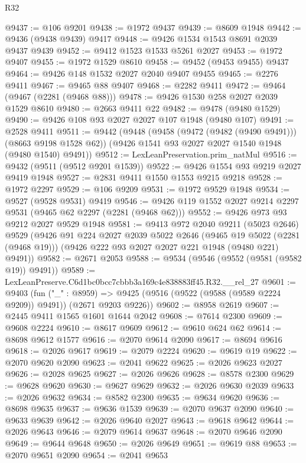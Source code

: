 \begin{lexlean}{R32}
\begin{coremodule}
@9437 := @106 @9201
@9438 := @1972 @9437
@9439 := @8609 @1948
@9442 := @9436 (@9438 @9439) @9417
@9448 := @9426 @1534 @1543 @8691 @2039 @9437 @9439
@9452 := @9412 @1523 @1533 @5261 @2027
@9453 := @1972 @9407
@9455 := @1972 @1529 @8610
@9458 := @9452 (@9453 @9455) @9437
@9464 := @9426 @148 @1532 @2027 @2040 @9407 @9455
@9465 := @2276 @9411
@9467 := @9465 @88 @9407
@9468 := @2282 @9411
@9472 := @9464 (@9467 (@2281 (@9468 @88)))
@9478 := @9426 @1530 @258 @2027 @2039 @1529 @8610
@9480 := @2663 @9411 @22
@9482 := @9478 (@9480 @1529)
@9490 := @9426 @108 @93 @2027 @2027 @107 @1948 (@9480 @107)
@9491 := @2528 @9411
@9511 := @9442
    (@9448
      (@9458 (@9472 (@9482 (@9490 @9491))) (@8663 @9198 @1528 @62))
      (@9426 @1541 @93 @2027 @2027 @1540 @1948 (@9480 @1540) @9491))
@9512 := LexLeanPreservation.prim_natMul
@9516 := @9432 (@9511 (@9512 @9201 @1539))
@9522 := @9426 @1554 @93 @9219 @2027 @9419 @1948
@9527 := @2831 @9411 @1550 @1553 @9215 @9218
@9528 := @1972 @2297
@9529 := @106 @9209
@9531 := @1972 @9529 @1948
@9534 := @9527 (@9528 @9531) @9419
@9546 := @9426 @119 @1552 @2027 @9214 @2297 @9531 (@9465 @62 @2297 (@2281 (@9468 @62)))
@9552 := @9426 @973 @93 @9212 @2027 @9529 @1948
@9581 := @9413
    @972
    @2040
    @9211
    (@5023 @2646)
    @9529
    (@9426
      @91
      @224
      @2027
      @2039
      @5022
      @2646
      (@9465 @19 @5022 (@2281 (@9468 @19)))
      (@9426 @222 @93 @2027 @2027 @221 @1948 (@9480 @221) @9491))
@9582 := @2671 @2053
@9588 := @9534 (@9546 (@9552 (@9581 (@9582 @19)) @9491))
@9589 := LexLeanPreserve.C6d1bc0bcc7cbbb3a169c4e838883ff45.R32.__rel_27
@9601 := @9403
    (fun ("_" : @8959) =>
    @9425 (@9516 (@9522 (@9588 (@9589 @2224 @9209)) @9491)) (@2671 @9203 @9226))
@9602 := @8958 @2619
@9607 := @2445 @9411 @1565 @1601 @1644 @2042
@9608 := @7614 @2300
@9609 := @9608 @2224
@9610 := @8617 @9609
@9612 := @9610 @624 @62
@9614 := @8698 @9612 @1577
@9616 := @2070 @9614 @2090
@9617 := @8694 @9616
@9618 := @2026 @9617
@9619 := @2079 @2224
@9620 := @9619 @19
@9622 := @2070 @9620 @2090
@9623 := @2041 @9622
@9625 := @2026 @9623 @2027
@9626 := @2028 @9625
@9627 := @2026 @9626
@9628 := @8578 @2300
@9629 := @9628 @9620
@9630 := @9627 @9629
@9632 := @2026 @9630 @2039
@9633 := @2026 @9632
@9634 := @8582 @2300
@9635 := @9634 @9620
@9636 := @8698 @9635
@9637 := @9636 @1539
@9639 := @2070 @9637 @2090
@9640 := @9633 @9639
@9642 := @2026 @9640 @2027
@9643 := @9618 @9642
@9644 := @2026 @9643
@9646 := @2079 @9614 @9637
@9648 := @2070 @9646 @2090
@9649 := @9644 @9648
@9650 := @2026 @9649
@9651 := @9619 @88
@9653 := @2070 @9651 @2090
@9654 := @2041 @9653

\end{coremodule}
\end{lexlean}
